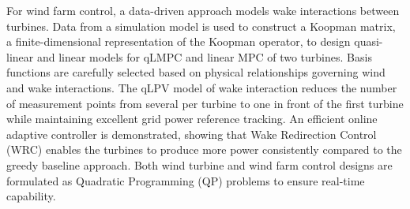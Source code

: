 \documentclass[11pt,a4paper]{article}
\begin{document}
   For wind farm control, a data-driven approach models wake interactions between turbines. Data from a simulation model is used to construct a Koopman matrix, a finite-dimensional representation of the Koopman operator, to design quasi-linear and linear models for qLMPC and linear  MPC of two turbines. Basis functions are carefully selected based on physical relationships governing wind and wake interactions. The qLPV model of wake interaction reduces the number of measurement points from several per turbine to one in front of the first turbine while maintaining excellent grid power reference tracking. An efficient online adaptive controller is demonstrated, showing that Wake Redirection Control (WRC) enables the turbines to produce more power consistently compared to the greedy baseline approach. Both wind turbine and wind farm control designs are formulated as Quadratic Programming (QP) problems to ensure real-time capability.  
       
\end{document}
